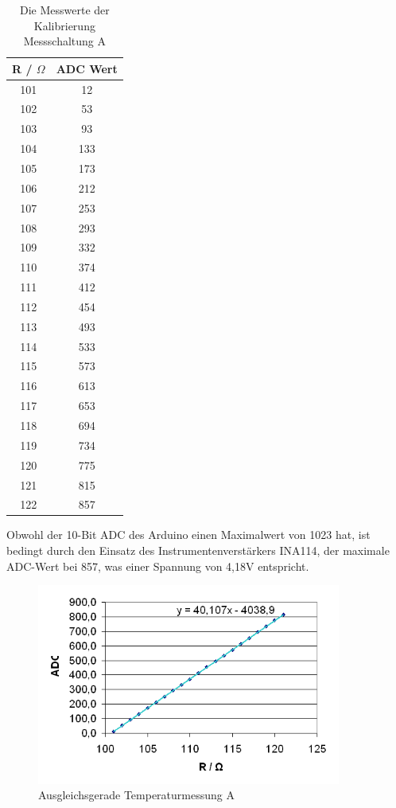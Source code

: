 \documentclass[a4paper,bibtotoc,oneside]{scrbook}
\begin{document}
\begin{table}[htbp]
\centering
\begin{tabular}{ | c | c | }\hline
{\bf R / $\Omega$ } & {\bf ADC Wert}\\ \hline
\hline
101 & 12\\ \hline
102 & 53\\ \hline
103 & 93\\ \hline
104 & 133\\ \hline
105 & 173\\ \hline
106 & 212\\ \hline
107 & 253\\ \hline
108 & 293\\ \hline
109 & 332\\ \hline
110 & 374\\ \hline
111 & 412\\ \hline
112 & 454\\ \hline
113 & 493\\ \hline
114 & 533\\ \hline
115 & 573\\ \hline
116 & 613\\ \hline
117 & 653\\ \hline
118 & 694\\ \hline
119 & 734\\ \hline
120 & 775\\ \hline
121 & 815\\ \hline
122 & 857\\ \hline
\end{tabular}
\caption{Die Messwerte der Kalibrierung Messschaltung A}\label{TabA}
\end{table}

Obwohl der 10-Bit ADC des Arduino einen Maximalwert von 1023 hat, ist bedingt durch den Einsatz des Instrumentenverstärkers INA114, der maximale ADC-Wert bei 857, was einer Spannung von 4,18V entspricht.  


\begin{figure}[htbp]
\centering
\includegraphics[width=100mm]{img/messa.png}
\caption{Ausgleichsgerade Temperaturmessung A}\label{messa}
\end{figure}
\end{document}
